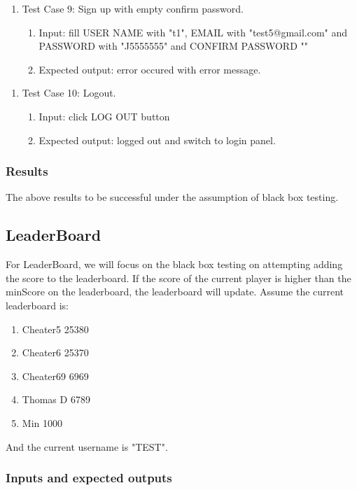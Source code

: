 \documentclass[11pt]{article}
\begin{document}
    \begin{enumerate}
        \item Test Case 9: Sign up with empty confirm password.
        \begin{enumerate}
            \item  Input: fill USER NAME with "t1", EMAIL with "test5@gmail.com" and PASSWORD with "J5555555" and CONFIRM PASSWORD ""
            \item  Expected output: error occured with error message.
        \end{enumerate}
    \end{enumerate}
    \begin{enumerate}
        \item Test Case 10: Logout.
        \begin{enumerate}
            \item  Input: click LOG OUT button
            \item  Expected output: logged out and switch to login panel.
        \end{enumerate}
    \end{enumerate}
    
    \subsubsection*{Results}

    The above results to be successful under the assumption of black box testing.

    \subsection{LeaderBoard}
    For LeaderBoard, we will focus on the black box testing on attempting adding the score to the leaderboard.
    If the score of the current player is higher than the minScore on the leaderboard, the leaderboard will update.
    Assume the current leaderboard is:
    \begin{enumerate}
        \item Cheater5 25380
        \item Cheater6 25370
        \item Cheater69 6969
        \item Thomas D  6789
        \item Min       1000
    \end{enumerate}
    And the current username is "TEST".

    \subsubsection*{Inputs and expected outputs}
\end{document}
